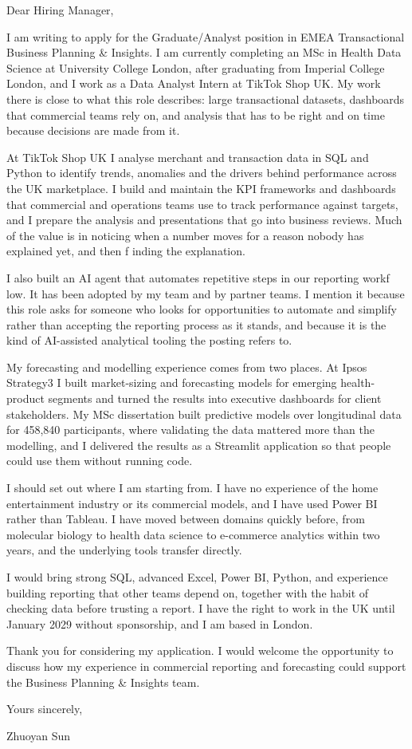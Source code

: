\documentclass[letterpaper,11pt]{article}
\begin{document}
Dear Hiring Manager,

I am writing to apply for the Graduate/Analyst position in EMEA Transactional Business Planning \& Insights. I am currently completing an MSc in Health Data Science at University College London, after graduating from Imperial College London, and I work as a Data Analyst Intern at TikTok Shop UK. My work there is close to what this role describes: large transactional datasets, dashboards that commercial teams rely on, and analysis that has to be right and on time because decisions are made from it.

At TikTok Shop UK I analyse merchant and transaction data in SQL and Python to identify trends, anomalies and the drivers behind performance across the UK marketplace. I build and maintain the KPI frameworks and dashboards that commercial and operations teams use to track performance against targets, and I prepare the analysis and presentations that go into business reviews. Much of the value is in noticing when a number moves for a reason nobody has explained yet, and then f\kern0pt inding the explanation.

I also built an AI agent that automates repetitive steps in our reporting workf\kern0pt low. It has been adopted by my team and by partner teams. I mention it because this role asks for someone who looks for opportunities to automate and simplify rather than accepting the reporting process as it stands, and because it is the kind of AI-assisted analytical tooling the posting refers to.

My forecasting and modelling experience comes from two places. At Ipsos Strategy3 I built market-sizing and forecasting models for emerging health-product segments and turned the results into executive dashboards for client stakeholders. My MSc dissertation built predictive models over longitudinal data for 458,840 participants, where validating the data mattered more than the modelling, and I delivered the results as a Streamlit application so that people could use them without running code.

I should set out where I am starting from. I have no experience of the home entertainment industry or its commercial models, and I have used Power BI rather than Tableau. I have moved between domains quickly before, from molecular biology to health data science to e-commerce analytics within two years, and the underlying tools transfer directly.

I would bring strong SQL, advanced Excel, Power BI, Python, and experience building reporting that other teams depend on, together with the habit of checking data before trusting a report. I have the right to work in the UK until January 2029 without sponsorship, and I am based in London.

Thank you for considering my application. I would welcome the opportunity to discuss how my experience in commercial reporting and forecasting could support the Business Planning \& Insights team.

\vspace{2pt}
Yours sincerely,

\vspace{8pt}
Zhuoyan Sun
\end{document}
